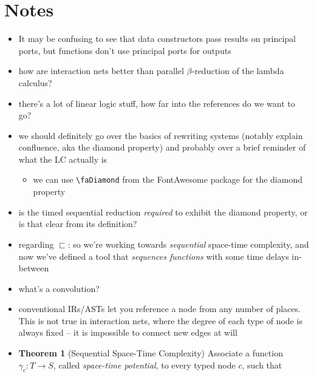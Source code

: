 \documentclass{fit-teorsem}
\begin{document}
\maketsheader
\thispagestyle{empty}

\section*{Notes}
\begin{itemize}
	\item It may be confusing to see that data constructors pass results on
		principal ports, but functions don't use principal ports for outputs
	\item how are interaction nets better than parallel $\beta$-reduction of
		the lambda calculus?
	\item there's a lot of linear logic stuff, how far into the references
		do we want to go?
	\item we should definitely go over the basics of rewriting systems
		(notably explain confluence, aka the diamond property) and
		probably over a brief reminder of what the LC actually is
		\begin{itemize}
			\item we can use \verb|\faDiamond| from the FontAwesome package
				for the diamond property
		\end{itemize}
	\item is the timed sequential reduction \textit{required} to exhibit
		the diamond property, or is that clear from its definition?
	\item regarding $\sqsubset$: so we're working towards \textit{sequential}
		space-time complexity, and now we've defined a tool that
		\textit{sequences functions} with some time delays in-between
	\item what's a convolution?
	\item conventional IRs/ASTs let you reference a node from any number of places.
		This is not true in interaction nets, where the degree of each type of node
		is always fixed -- it is impossible to connect new edges at will
	\item \textbf{Theorem 1} (Sequential Space-Time Complexity) Associate a function $\gamma_c : T \to S$,
		called \textit{space-time potential}, to every typed node $c$, such that

\end{itemize}
\end{document}
